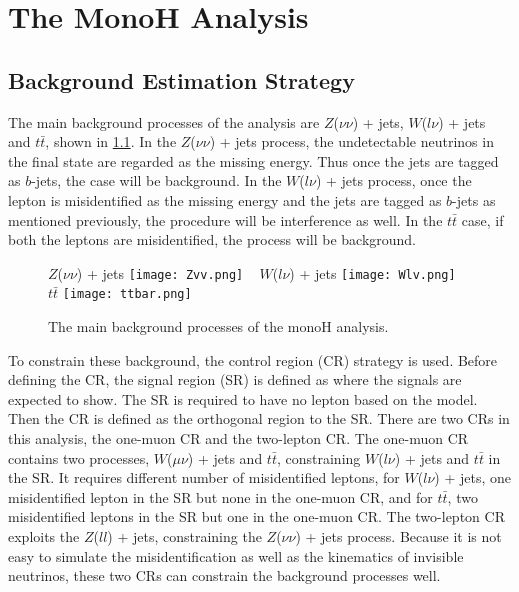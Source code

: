 \documentclass[class=NTHU_thesis, crop=false]{standalone}
\begin{document}
\chapter{The MonoH Analysis}
\section{Background Estimation Strategy}
The main background processes of the analysis are $Z$($\nu\nu$) + jets, $W$($l\nu$) + jets and $t\bar{t}$, shown in \cref{fig:Bkg-Processes}. In the $Z$($\nu\nu$) + jets process, the undetectable neutrinos in the final state are regarded as the missing energy. Thus once the jets are tagged as $b$-jets, the case will be background. In the $W$($l\nu$) + jets process, once the lepton is misidentified as the missing energy and the jets are tagged as $b$-jets as mentioned previously, the procedure will be interference as well. In the $t\bar{t}$ case, if both the leptons are misidentified, the process will be background.

\begin{figure}[!hbt]
	\captionsetup[subfigure]{labelformat=empty}
	\centering
	\subcaptionbox
	{$Z$($\nu\nu$) + jets
		\label{fig:Bkg-Processes-fig1}}
	{\texttt{[image: Zvv.png]}}
	~
	\subcaptionbox
	{$W$($l\nu$) + jets
		\label{fig:Bkg-Processes-fig2}}
	{\texttt{[image: Wlv.png]}}
	~
	\subcaptionbox
	{$t\bar{t}$
		\label{fig:Bkg-Processes-fig3}}
	{\texttt{[image: ttbar.png]}}
	\caption{The main background processes of the monoH analysis.}
	\label{fig:Bkg-Processes}
\end{figure}

To constrain these background, the control region (CR) strategy is used. Before defining the CR, the signal region (SR) is defined as where the signals are expected to show. The SR is required to have no lepton based on the model. Then the CR is defined as the orthogonal region to the SR. There are two CRs in this analysis, the one-muon CR and the two-lepton CR. The one-muon CR contains two processes, $W$($\mu\nu$) + jets and $t\bar{t}$, constraining $W$($l\nu$) + jets and $t\bar{t}$ in the SR. It requires different number of misidentified leptons, for $W$($l\nu$) + jets, one misidentified lepton in the SR but none in the one-muon CR, and for $t\bar{t}$, two misidentified leptons in the SR but one in the one-muon CR. The two-lepton CR exploits the $Z$($ll$) + jets, constraining the $Z$($\nu\nu$) + jets process. Because it is not easy to simulate the misidentification as well as the kinematics of invisible neutrinos, these two CRs can constrain the background processes well.
\end{document}
